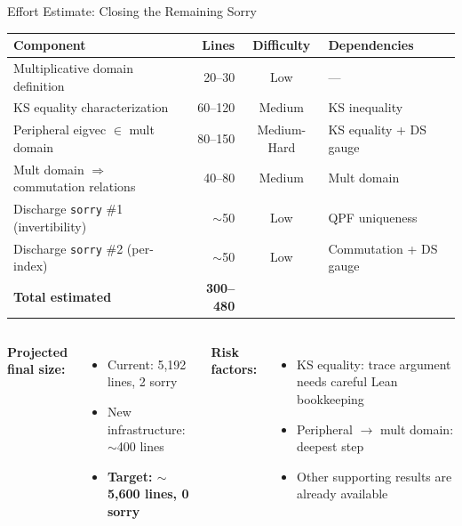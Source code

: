 \documentclass[aspectratio=169,10pt]{beamer}
\begin{document}
\begin{frame}{Effort Estimate: Closing the Remaining Sorry}
    \vspace{-0.5em}

    {\small
    \begin{tabular}{@{}p{5.5cm}rcl@{}}
        \toprule
        \textbf{Component} & \textbf{Lines} & \textbf{Difficulty} & \textbf{Dependencies} \\
        \midrule
        \rowcolor{cardbg}
        Multiplicative domain definition & 20--30 & Low &
            --- \\
        KS equality characterization & 60--120 & Medium &
            KS inequality \\
        \rowcolor{cardbg}
        Peripheral eigvec $\in$ mult domain & 80--150 & Medium-Hard &
            KS equality + DS gauge \\
        Mult domain $\Rightarrow$ commutation relations & 40--80 & Medium &
            Mult domain \\
        \rowcolor{cardbg}
        Discharge \texttt{sorry} \#1 (invertibility) & $\sim$50 & Low &
            QPF uniqueness \\
        Discharge \texttt{sorry} \#2 (per-index) & $\sim$50 & Low &
            Commutation + DS gauge \\
        \midrule
        \textbf{Total estimated} & \textbf{300--480} & & \\
        \bottomrule
    \end{tabular}
    }

    \vspace{0.3em}
    \begin{columns}[T]
        \textbf{Projected final size:}
        \begin{itemize}\itemsep0.05em\small
            \item Current: 5{,}192 lines, 2 sorry
            \item New infrastructure: $\sim$400 lines
            \item \textbf{Target: $\sim$5{,}600 lines, 0 sorry}
        \end{itemize}

        \textbf{Risk factors:}
        \begin{itemize}\itemsep0.05em\small
            \item[\textcolor{amber}{$\circ$}] KS equality: trace argument needs careful Lean bookkeeping
            \item[\textcolor{amber}{$\circ$}] Peripheral $\to$ mult domain: deepest step
            \item[\textcolor{leangreen}{\checkmark}] Other supporting results are already available
        \end{itemize}
    \end{columns}
\end{frame}
\end{document}
